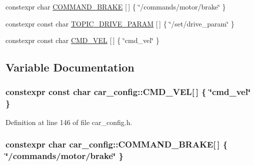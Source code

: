 \begin{DoxyCompactItemize}
\item 
constexpr char \hyperlink{namespacecar__config_ab3b957004ca9df19d509c984937723f7}{C\+O\+M\+M\+A\+N\+D\+\_\+\+B\+R\+A\+KE} \mbox{[}$\,$\mbox{]} \{ \char`\"{}/commands/motor/brake\char`\"{} \}
\item 
constexpr const char \hyperlink{namespacecar__config_a329dea882fb03eb1cec1af42977fa0c6}{T\+O\+P\+I\+C\+\_\+\+D\+R\+I\+V\+E\+\_\+\+P\+A\+R\+AM} \mbox{[}$\,$\mbox{]} \{ \char`\"{}/set/drive\+\_\+param\char`\"{} \}
\item 
constexpr const char \hyperlink{namespacecar__config_aba040863633ec405f179baf953ba002c}{C\+M\+D\+\_\+\+V\+EL} \mbox{[}$\,$\mbox{]} \{ \char`\"{}cmd\+\_\+vel\char`\"{} \}
\end{DoxyCompactItemize}


\subsection{Variable Documentation}
\subsubsection[{\texorpdfstring{C\+M\+D\+\_\+\+V\+EL}{CMD_VEL}}]{\setlength{\rightskip}{0pt plus 5cm}constexpr const char car\+\_\+config\+::\+C\+M\+D\+\_\+\+V\+EL\mbox{[}$\,$\mbox{]} \{ \char`\"{}cmd\+\_\+vel\char`\"{} \}}\hypertarget{namespacecar__config_aba040863633ec405f179baf953ba002c}{}\label{namespacecar__config_aba040863633ec405f179baf953ba002c}


Definition at line 146 of file car\+\_\+config.\+h.

\subsubsection[{\texorpdfstring{C\+O\+M\+M\+A\+N\+D\+\_\+\+B\+R\+A\+KE}{COMMAND_BRAKE}}]{\setlength{\rightskip}{0pt plus 5cm}constexpr char car\+\_\+config\+::\+C\+O\+M\+M\+A\+N\+D\+\_\+\+B\+R\+A\+KE\mbox{[}$\,$\mbox{]} \{ \char`\"{}/commands/motor/brake\char`\"{} \}}\hypertarget{namespacecar__config_ab3b957004ca9df19d509c984937723f7}{}\label{namespacecar__config_ab3b957004ca9df19d509c984937723f7}


